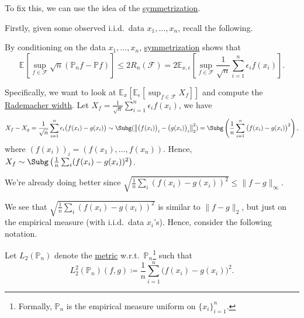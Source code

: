 \begin{intuition}
	To fix this, we can use the idea of the \hyperref[lma:symmetrization]{symmetrization}.
\end{intuition}

Firstly, given some observed i.i.d.\ data \(x_1, \dots , x_n\), recall the following.

\begin{prev}
	By conditioning on the data \(x_1, \dots , x_n\), \hyperref[lma:symmetrization]{symmetrization} shows that
	\[
		\mathbb{E}_{}\left[\sup _{f\in \mathscr{F} } \sqrt{n} (\mathbb{P} _n f - \mathbb{P} f) \right]
		\leq 2R_n(\mathscr{\mathscr{F} } )
		= 2\mathbb{E}_{x, \epsilon }\left[ \sup _{f\in \mathscr{F} } \frac{1}{\sqrt{n} }\sum_{i=1}^{n} \epsilon _i f(x_i) \right] .
	\]
\end{prev}

Specifically, we want to look at \(\mathbb{E}_{x}\left[\mathbb{E}_{\epsilon }\left[ \sup _{f\in \mathscr{F} } X_f \right] \right]\) and compute the \hyperref[def:Rademacher-width]{Rademacher width}. Let \(X_f = \frac{1}{\sqrt{n} } \sum_{i=1}^{n} \epsilon _i f(x_i)\), we have
\[
	X_f - X_g
	= \frac{1}{\sqrt{n} } \sum_{i=1}^{n} \epsilon _i \big(f(x_i) - g(x_i)\big)
	\sim \Subg(\left\lVert \big(f(x_i)\big)_i - \big(g(x_i)\big)_i \right\rVert _2^2)
	= \Subg\left( \frac{1}{n}\sum_{i=1}^{n} \big(f(x_i) - g(x_i)\big)^2 \right) ,
\]
where \((f(x_i))_i = (f(x_1), \dots , f(x_n))\). Hence, \(X_f \sim \Subg\left( \frac{1}{n}\sum_{i} (f(x_i) - g(x_i))^2 \right) \).

\begin{note}
	We're already doing better since \(\sqrt{\frac{1}{n}\sum_{i} (f(x_i) - g(x_i))^2} \leq \lVert f - g \rVert _\infty \).
\end{note}

We see that \(\sqrt{\frac{1}{n}\sum_{i} (f(x_i) - g(x_i))^2}\) is similar to \(\lVert f - g \rVert _2\), but just on the empirical measure (with i.i.d.\ data \(x_i\)'s). Hence, consider the following notation.

\begin{notation}
	Let \(L_2(\mathbb{P} _n)\) denote the \hyperref[def:pseudo-metric]{metric} w.r.t.\ \(\mathbb{P} _n\)\footnote{Formally, \(\mathbb{P} _n\) is the empirical measure uniform on \(\{ x_i \} _{i=1}^n\).} such that
	\[
		L_2^2(\mathbb{P} _n) (f, g) \coloneqq \frac{1}{n}\sum_{i=1}^{n} \big(f(x_i) - g(x_i)\big)^2.
	\]
\end{notation}

